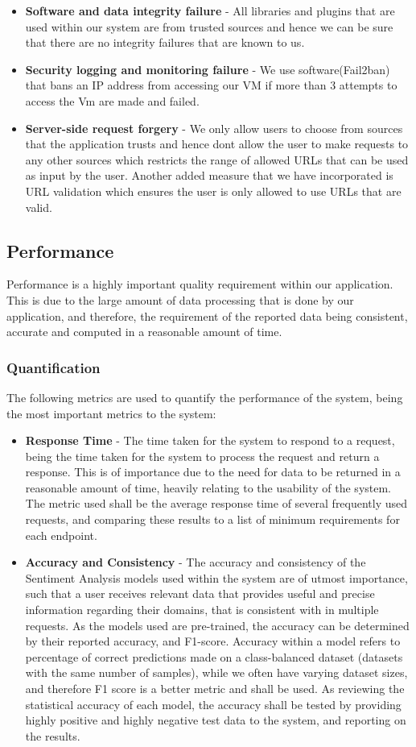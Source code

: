 \documentclass[12pt]{article}
\begin{document}
\begin{itemize}
    \item \textbf{Software and data integrity failure} - All libraries and plugins that are used within our system are from trusted sources and hence we can be sure that there are no integrity failures that are known to us.
    \item \textbf{Security logging and monitoring failure} - We use software(Fail2ban) that bans an IP address from accessing our VM if more than 3 attempts to access the Vm are made and failed.
    \item \textbf{Server-side request forgery} - We only allow users to choose from sources that the application trusts and hence dont allow the user to make requests to any other sources which restricts the range of allowed URLs that can be used as input by the user. Another added measure that we have incorporated is URL validation which ensures the user is only allowed to use URLs that are valid.
\end{itemize}
\newpage
\subsection{Performance}
Performance is a highly important quality requirement within our application. This is due to the large amount of data processing that is done by our application, and therefore, the requirement of the reported data being consistent, accurate and computed in a reasonable amount of time.
\subsubsection{Quantification}
The following metrics are used to quantify the performance of the system, being the most important metrics to the system:
\begin{itemize}
    \item \textbf{Response Time} - The time taken for the system to respond to a request, being the time taken for the system to process the request and return a response. This is of importance due to the need for data to be returned in a reasonable amount of time, heavily relating to the usability of the system.
          The metric used shall be the average response time of several frequently used requests, and comparing these results to a list of minimum requirements for each endpoint.
    \item \textbf{Accuracy and Consistency} - The accuracy and consistency of the Sentiment Analysis models used within the system are of utmost importance, such that a user receives relevant data that provides useful and precise information regarding their domains, that is consistent with in multiple requests.
          As the models used are pre-trained, the accuracy can be determined by their reported accuracy, and F1-score. Accuracy within a model refers to percentage of correct predictions made on a class-balanced dataset (datasets with the same number of samples), while we often have varying dataset sizes, and therefore F1 score is a better metric and shall be used. As reviewing the statistical accuracy of each model, the accuracy shall be tested by providing highly positive and highly negative test data to the system, and reporting on the results.
\end{itemize}
\end{document}
